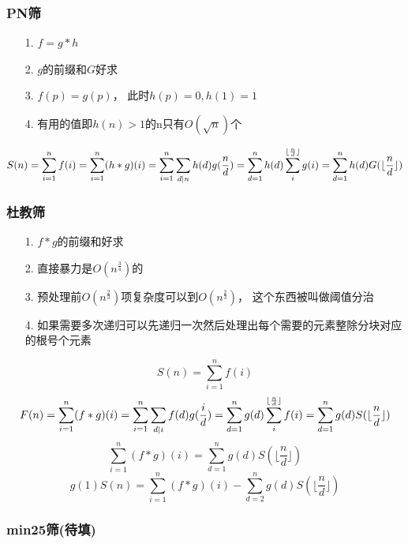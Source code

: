 \documentclass[UTF8]{article}
\begin{document}
\subsubsection{PN筛}
\begin{enumerate}
	\item[1.] $f = g * h$
	\item[2.] $g$的前缀和$G$好求
	\item[3.] $f(p) = g(p)$， 此时$h(p) = 0, h(1) = 1$
	\item[4.] 有用的值即$h(n)>1$的n只有$O(\sqrt{n})$个
\end{enumerate}
$$S(n) = \sum_{i=1}^n f(i) \\
	= \sum_{i=1}^n (h*g)(i) \\
	= \sum_{i=1}^n \sum_{d|n} h(d)g(\frac{n}{d}) \\
	= \sum_{d=1}^n h(d) \sum_i^{\lfloor \frac{n}{d} \rfloor} g(i)\\
	= \sum_{d=1}^n h(d) G(\lfloor \frac{n}{d} \rfloor) \\
$$

\subsubsection{杜教筛}
\begin{enumerate}
	\item[1.] $f * g的前缀和好求$
	\item[2.] 直接暴力是$O(n^{\frac{3}{4}})$的
	\item[3.] 预处理前$O(n^{\frac{2}{3}})$项复杂度可以到$O(n^{\frac{2}{3}})$， 这个东西被叫做阈值分治
	\item[4.] 如果需要多次递归可以先递归一次然后处理出每个需要的元素整除分块对应的根号个元素
\end{enumerate}
$$S(n) = \sum_{i=1}^n f(i)$$
$$F(n) = \sum_{i=1}^n (f*g)(i) \\
= \sum_{i=1}^n \sum_{d|i} f(d)g(\frac{i}{d}) \\
= \sum_{d=1}^n g(d)\sum_{i}^{\lfloor \frac{n}{d} \rfloor} f(i) \\
= \sum_{d=1}^n g(d)S(\lfloor \frac{n}{d} \rfloor)\\
$$
$$\sum_{i=1}^n (f*g)(i) = \sum_{d=1}^n g(d)S(\lfloor \frac{n}{d} \rfloor)$$
$$g(1)S(n) = \sum_{i=1}^n (f*g)(i) - \sum_{d=2}^n g(d)S(\lfloor \frac{n}{d} \rfloor)$$

\subsubsection{min25筛(待填)}
\end{document}
